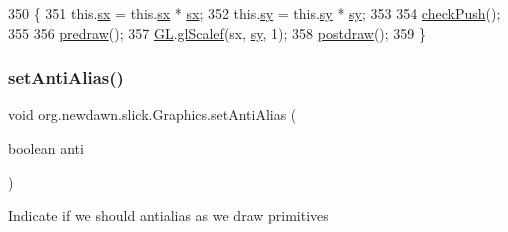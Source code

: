 \begin{DoxyCode}
350                                           \{
351         this.\mbox{\hyperlink{classorg_1_1newdawn_1_1slick_1_1_graphics_a4678c53357b785b1af9ea7a163f65dd1}{sx}} = this.\mbox{\hyperlink{classorg_1_1newdawn_1_1slick_1_1_graphics_a4678c53357b785b1af9ea7a163f65dd1}{sx}} * \mbox{\hyperlink{classorg_1_1newdawn_1_1slick_1_1_graphics_a4678c53357b785b1af9ea7a163f65dd1}{sx}};
352         this.\mbox{\hyperlink{classorg_1_1newdawn_1_1slick_1_1_graphics_a8bf991be4929bf3257a80d0176c472a1}{sy}} = this.\mbox{\hyperlink{classorg_1_1newdawn_1_1slick_1_1_graphics_a8bf991be4929bf3257a80d0176c472a1}{sy}} * \mbox{\hyperlink{classorg_1_1newdawn_1_1slick_1_1_graphics_a8bf991be4929bf3257a80d0176c472a1}{sy}};
353         
354         \mbox{\hyperlink{classorg_1_1newdawn_1_1slick_1_1_graphics_a58dfa60d60ec7f56b17e420458b3724e}{checkPush}}();
355 
356         \mbox{\hyperlink{classorg_1_1newdawn_1_1slick_1_1_graphics_a7b4c203181e3b6302d51ed9b24596b8d}{predraw}}();
357         \mbox{\hyperlink{classorg_1_1newdawn_1_1slick_1_1_graphics_a39ca68db81b225982a4421c4a6835eed}{GL}}.\mbox{\hyperlink{interfaceorg_1_1newdawn_1_1slick_1_1opengl_1_1renderer_1_1_s_g_l_a3af948fb9b1074143a0ce384a2035d02}{glScalef}}(sx, \mbox{\hyperlink{classorg_1_1newdawn_1_1slick_1_1_graphics_a8bf991be4929bf3257a80d0176c472a1}{sy}}, 1);
358         \mbox{\hyperlink{classorg_1_1newdawn_1_1slick_1_1_graphics_abe054371d1486618ff327bbbcf02ff97}{postdraw}}();
359     \}
\end{DoxyCode}
\mbox{\label{classorg_1_1newdawn_1_1slick_1_1_graphics_aab07c0e6d3f7800fa60c3d26d27f80a1}} 
\subsubsection{\texorpdfstring{set\+Anti\+Alias()}{setAntiAlias()}}
{\footnotesize\ttfamily void org.\+newdawn.\+slick.\+Graphics.\+set\+Anti\+Alias (\begin{DoxyParamCaption}\item[{boolean}]{anti }\end{DoxyParamCaption})\hspace{0.3cm}{\ttfamily [inline]}}

Indicate if we should antialias as we draw primitives


